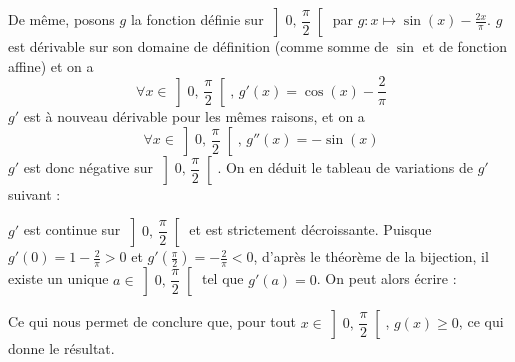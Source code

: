 {{De même, posons $g$ la fonction définie sur $\left] 0,\,\dfrac{\pi}{2}\right[$ par $g:x\mapsto \sin(x)-\frac{2x}{\pi}$. $g$ est dérivable sur son domaine de définition (comme somme de $\sin$ et de fonction affine) et on a \[~\forall x\in \left]0,\,\dfrac{\pi}{2}\right[,\, g'(x) = \cos(x)-\frac{2}{\pi} \]
$g'$ est à nouveau dérivable pour les mêmes raisons, et on a
\[~\forall x\in \left]0,\,\dfrac{\pi}{2}\right[,\, g''(x) = -\sin(x) \]
$g'$ est donc négative sur $\left] 0,\,\dfrac{\pi}{2}\right[$. On en déduit le tableau de variations de $g'$ suivant :
\begin{center}
\end{center}
$g'$ est continue sur $\left] 0,\,\dfrac{\pi}{2}\right[$ et est strictement décroissante. Puisque $g'(0)=1-\frac{2}{\pi}>0$ et $g'\left(\frac{\pi}{2}\right)=-\frac{2}{\pi}<0$, d'après le théorème de la bijection, il existe un unique $a\in \left]0,\,\dfrac{\pi}{2}\right[$ tel que $g'(a)=0$. On peut alors écrire :
\begin{center}
\end{center}
Ce qui nous permet de conclure que, pour tout $x\in \left] 0,\,\dfrac{\pi}{2}\right[$, $g(x)\geq 0$, ce qui donne le résultat.}
}

